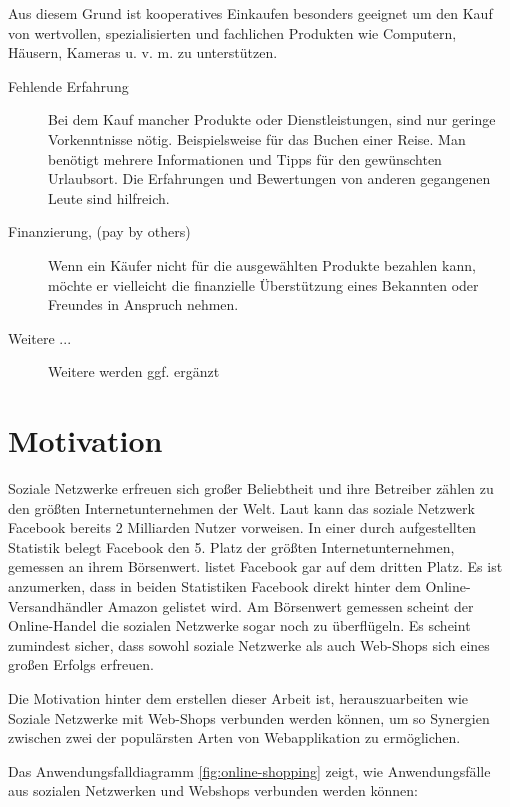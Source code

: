 Aus diesem Grund ist kooperatives Einkaufen besonders geeignet um den Kauf von wertvollen, spezialisierten und fachlichen Produkten wie Computern, Häusern, Kameras u. v. m. zu unterstützen.

\begin{description}
\item[Fehlende Erfahrung] Bei dem Kauf mancher Produkte oder Dienstleistungen, sind nur geringe Vorkenntnisse nötig. Beispielsweise für das Buchen einer Reise. Man benötigt mehrere Informationen und Tipps für den gewünschten Urlaubsort. Die Erfahrungen und Bewertungen von anderen gegangenen Leute sind hilfreich.
\item[Finanzierung, (pay by others)] Wenn ein Käufer nicht für die ausgewählten Produkte bezahlen kann, möchte er vielleicht die finanzielle Überstützung eines Bekannten oder Freundes in Anspruch nehmen.
\item[Weitere ...] Weitere werden ggf. ergänzt
\end{description}


\section{Motivation}

Soziale Netzwerke erfreuen sich großer Beliebtheit und ihre Betreiber zählen zu den größten Internetunternehmen der Welt. Laut \textcite{sokolov:facebook} kann das soziale Netzwerk Facebook bereits 2 Milliarden Nutzer vorweisen. In einer durch \textcite{nasdaq} aufgestellten Statistik belegt Facebook den 5. Platz der größten Internetunternehmen, gemessen an ihrem Börsenwert. \textcite{mittermeier} listet Facebook gar auf dem dritten Platz. Es ist anzumerken, dass in beiden Statistiken Facebook direkt hinter dem Online-Versandhändler Amazon gelistet wird. Am Börsenwert gemessen scheint der Online-Handel die sozialen Netzwerke sogar noch zu überflügeln. Es scheint zumindest sicher, dass sowohl soziale Netzwerke als auch Web-Shops sich eines großen Erfolgs erfreuen.

Die Motivation hinter dem erstellen dieser Arbeit ist, herauszuarbeiten wie Soziale Netzwerke mit Web-Shops verbunden werden können, um so Synergien zwischen zwei der populärsten Arten von Webapplikation zu ermöglichen.

Das Anwendungsfalldiagramm \vref{fig:online-shopping} zeigt, wie Anwendungsfälle aus sozialen Netzwerken und Webshops verbunden werden können:

